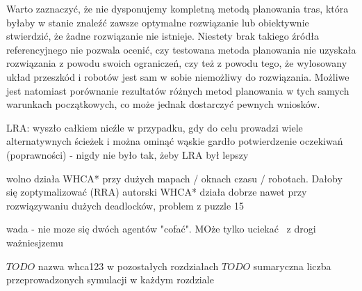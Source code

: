 Warto zaznaczyć, że nie dysponujemy kompletną metodą planowania tras, która byłaby w stanie znaleźć zawsze optymalne rozwiązanie lub obiektywnie stwierdzić, że żadne rozwiązanie nie istnieje.
Niestety brak takiego źródła referencyjnego nie pozwala ocenić, czy testowana metoda planowania nie uzyskała rozwiązania z powodu swoich ograniczeń, czy też z powodu tego, że wylosowany układ przeszkód i robotów jest sam w sobie niemożliwy do rozwiązania.
Możliwe jest natomiast porównanie rezultatów różnych metod planowania w tych samych warunkach początkowych, co może jednak dostarczyć pewnych wniosków.


LRA: wyszło całkiem nieźle w przypadku, gdy do celu prowadzi wiele alternatywnych ścieżek i można ominąć wąskie gardło
potwierdzenie oczekiwań (poprawności) - nigdy nie było tak, żeby LRA był lepszy

wolno działa WHCA* przy dużych mapach / oknach czasu / robotach. Dałoby się zoptymalizować (RRA)
autorski WHCA* działa dobrze nawet przy rozwiązywaniu dużych deadlocków, problem z puzzle 15

wada - nie moze się dwóch agentów "cofać". MOże tylko uciekać  z drogi ważniesjzemu


$TODO$ nazwa whca123 w pozostałych rozdziałach
$TODO$ sumaryczna liczba przeprowadzonych symulacji w każdym rozdziale